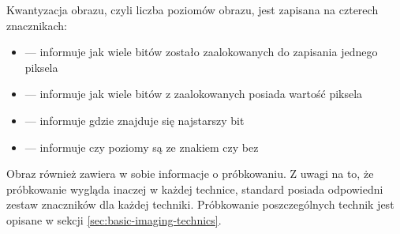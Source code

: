 \dicomRetired

\par
Kwantyzacja obrazu, czyli liczba poziomów obrazu, jest zapisana na czterech znacznikach:
\begin{itemize}
    \item {} --- informuje jak wiele bitów zostało zaalokowanych do zapisania jednego piksela
    \item {} --- informuje jak wiele bitów z zaalokowanych posiada wartość piksela
    \item {} --- informuje gdzie znajduje się najstarszy bit
    \item {} --- informuje czy poziomy są ze znakiem czy bez
\end{itemize}

\par
Obraz \DICOM również zawiera w sobie informacje o próbkowaniu.
Z uwagi na to, że próbkowanie wygląda inaczej w każdej technice, standard posiada odpowiedni zestaw znaczników dla każdej techniki.
Próbkowanie poszczególnych technik jest opisane w sekcji \ref{sec:basic-imaging-technics}.







